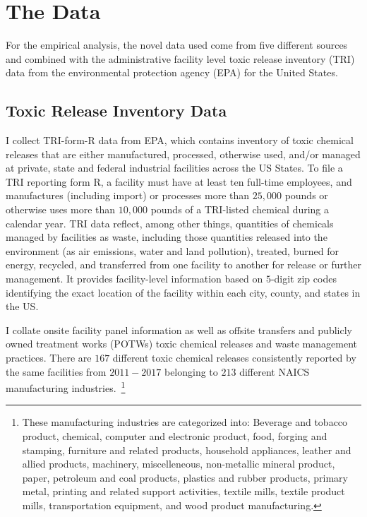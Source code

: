 \documentclass{C:/Users/david/OneDrive/Documents/ULMS/PhD/Thesis/chapter3/src/climate_change/latex/Economic_Journal/OUP-EJ}
\begin{document}
    \section{The Data}\label{sec:data}
    For the empirical analysis, the novel data used come from five different sources and combined with the administrative facility level toxic release inventory (TRI) data from the environmental protection agency (EPA) for the United States.

    \subsection{Toxic Release Inventory Data}\label{subsec:toxic-release-inventory-data}
    I collect TRI-form-R data from EPA, which contains inventory of toxic chemical releases that are either manufactured, processed, otherwise used, and/or managed at private, state and federal industrial facilities across the US States. To file a TRI reporting form R, a facility must have at least ten full-time employees, and manufactures (including import) or processes more than $25,000$ pounds or otherwise uses more than $10,000$ pounds of a TRI-listed chemical during a calendar year. TRI data reflect, among other things, quantities of chemicals managed by facilities as waste, including those quantities released into the environment (as air emissions, water and land pollution), treated, burned for energy, recycled, and transferred from one facility to another for release or further management. It provides facility-level information based on $5$-digit zip codes identifying the exact location of the facility within each city, county, and states in the US.

    I collate onsite facility panel information as well as offsite transfers and publicly owned treatment works (POTWs) toxic chemical releases and waste management practices. There are $167$ different toxic chemical releases consistently reported by the same facilities from $2011-2017$ belonging to $213$ different NAICS manufacturing industries.~\footnote{\tiny These manufacturing industries are categorized into: Beverage and tobacco product, chemical, computer and electronic product, food, forging and stamping, furniture and related products, household appliances, leather and allied products, machinery, miscelleneous, non-metallic mineral product, paper, petroleum and coal products, plastics and rubber products, primary metal, printing and related support activities, textile mills, textile product mills, transportation equipment, and wood product manufacturing.}
\end{document}
